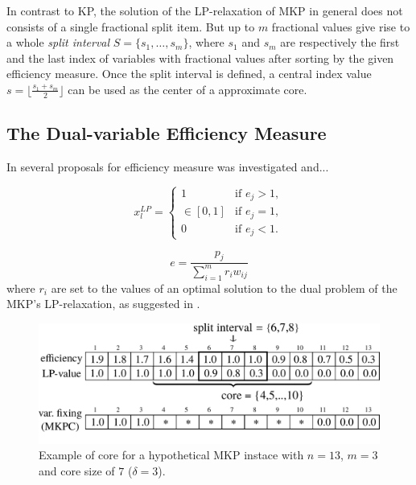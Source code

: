 In contrast to KP, the solution of the LP-relaxation of MKP in general does not
consists of a single fractional split item. But up to $m$ fractional values give
rise to a whole \emph{split interval} $S = \{ s_1, \ldots, s_m\}$, where
$s_1$ and $s_m$ are respectively the first and the last index of variables with
fractional values after sorting by the given efficiency measure.
Once the split interval is defined, a central index value $s = \lfloor \frac{s_1+s_m}{2}\rfloor$
can be used as the center of a approximate core.

\subsection{The Dual-variable Efficiency Measure}
\label{subsec:dual}
In \cite{puchinger2006core} several proposals for efficiency measure was
investigated and...

\begin{displaymath}
 x_l^{LP} =
  \begin{cases}
    1         & \mbox{if } e_j > 1, \\
    \in [0,1] & \mbox{if } e_j = 1, \\
    0         & \mbox{if } e_j < 1.
  \end{cases}
\end{displaymath}

\begin{displaymath}
  e = \frac{p_j}{\sum_{i=1}^m r_iw_{ij}}
\end{displaymath}
where $r_i$ are set to the values of an optimal solution to the dual problem of
the MKP's LP-relaxation, as suggested in \cite{Chu-Beasley-1998}.

\begin{figure}[h]
  \centering
  \includegraphics[scale=0.37]{imgs/mkp_2}
  \caption{Example of core for a hypothetical MKP instace with $n=13$, $m=3$ and core size of $7$ ($\delta = 3$).}
  \label{fig:mkpcore}
\end{figure}


\cite{puchinger2006core}


